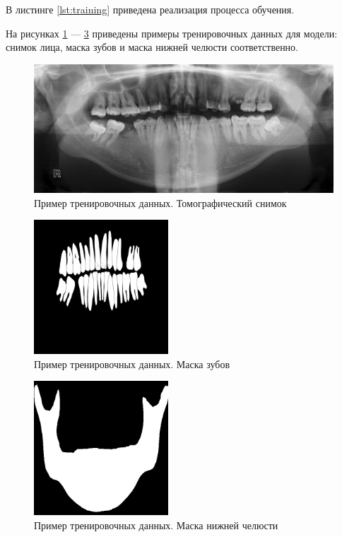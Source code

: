 В листинге \ref{lst:training} приведена реализация процесса обучения.



На рисунках \ref{fig:scan} --- \ref{fig:mandible} приведены примеры тренировочных данных для модели: снимок лица, маска зубов и маска нижней челюсти соответственно.

\begin{figure}[H]
	\centering
	\includegraphics[width=\textwidth]{img/scan.png}
	\caption{Пример тренировочных данных. Томографический снимок}
	\label{fig:scan}
\end{figure}

\begin{figure}[H]
	\centering
	\includegraphics[width=190px]{img/teeth.png}
	\caption{Пример тренировочных данных. Маска зубов}
	\label{fig:teeth}
\end{figure}

\begin{figure}[H]
	\centering
	\includegraphics[width=190px]{img/mandible.png}
	\caption{Пример тренировочных данных. Маска нижней челюсти}
	\label{fig:mandible}
\end{figure}

